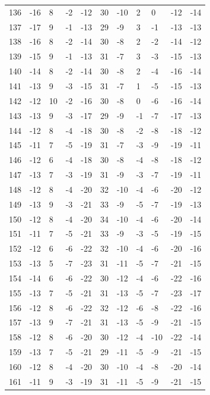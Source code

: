 \begin{table}[H]
\begin{tabular}{lllllllllll}
136 & -16 & 8 & -2 & -12 & 30 & -10 & 2 & 0 & -12 & -14 \\
137 & -17 & 9 & -1 & -13 & 29 & -9 & 3 & -1 & -13 & -13 \\
138 & -16 & 8 & -2 & -14 & 30 & -8 & 2 & -2 & -14 & -12 \\
139 & -15 & 9 & -1 & -13 & 31 & -7 & 3 & -3 & -15 & -13 \\
140 & -14 & 8 & -2 & -14 & 30 & -8 & 2 & -4 & -16 & -14 \\
141 & -13 & 9 & -3 & -15 & 31 & -7 & 1 & -5 & -15 & -13 \\
142 & -12 & 10 & -2 & -16 & 30 & -8 & 0 & -6 & -16 & -14 \\
143 & -13 & 9 & -3 & -17 & 29 & -9 & -1 & -7 & -17 & -13 \\
144 & -12 & 8 & -4 & -18 & 30 & -8 & -2 & -8 & -18 & -12 \\
145 & -11 & 7 & -5 & -19 & 31 & -7 & -3 & -9 & -19 & -11 \\
146 & -12 & 6 & -4 & -18 & 30 & -8 & -4 & -8 & -18 & -12 \\
147 & -13 & 7 & -3 & -19 & 31 & -9 & -3 & -7 & -19 & -11 \\
148 & -12 & 8 & -4 & -20 & 32 & -10 & -4 & -6 & -20 & -12 \\
149 & -13 & 9 & -3 & -21 & 33 & -9 & -5 & -7 & -19 & -13 \\
150 & -12 & 8 & -4 & -20 & 34 & -10 & -4 & -6 & -20 & -14 \\
151 & -11 & 7 & -5 & -21 & 33 & -9 & -3 & -5 & -19 & -15 \\
152 & -12 & 6 & -6 & -22 & 32 & -10 & -4 & -6 & -20 & -16 \\
153 & -13 & 5 & -7 & -23 & 31 & -11 & -5 & -7 & -21 & -15 \\
154 & -14 & 6 & -6 & -22 & 30 & -12 & -4 & -6 & -22 & -16 \\
155 & -13 & 7 & -5 & -21 & 31 & -13 & -5 & -7 & -23 & -17 \\
156 & -12 & 8 & -6 & -22 & 32 & -12 & -6 & -8 & -22 & -16 \\
157 & -13 & 9 & -7 & -21 & 31 & -13 & -5 & -9 & -21 & -15 \\
158 & -12 & 8 & -6 & -20 & 30 & -12 & -4 & -10 & -22 & -14 \\
159 & -13 & 7 & -5 & -21 & 29 & -11 & -5 & -9 & -21 & -15 \\
160 & -12 & 8 & -4 & -20 & 30 & -10 & -4 & -8 & -20 & -14 \\
161 & -11 & 9 & -3 & -19 & 31 & -11 & -5 & -9 & -21 & -15 \\

\end{tabular}
\end{table}
